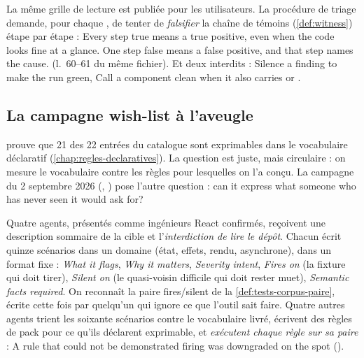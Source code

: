 La même grille de lecture est publiée pour les utilisateurs. La procédure de triage  demande, pour chaque \Warning{}, de tenter de \emph{falsifier} la chaîne de témoins (\cref{def:witness}) étape par étape : \og Every step true means a true positive, even when the code looks fine at a glance. One step false means a false positive, and that step names the cause.\fg{} (l.~60--61 du même fichier). Et deux interdits : \og Silence a finding to make the run green\fg{}, \og Call a component clean when it also carries  or \fg{}.

\subsection{La campagne \og wish-list à l'aveugle\fg{}}

 prouve que 21 des 22 entrées du catalogue sont exprimables dans le vocabulaire déclaratif (\cref{chap:regles-declaratives}). La question est juste, mais circulaire : on mesure le vocabulaire contre les règles pour lesquelles on l'a conçu. La campagne du 2 septembre 2026 (, ) pose l'autre question : \og can it express what someone who has never seen it would ask for?\fg{}

Quatre agents, présentés comme ingénieurs React confirmés, reçoivent une description sommaire de la cible et l'\emph{interdiction de lire le dépôt}. Chacun écrit quinze scénarios dans un domaine (état, effets, rendu, asynchrone), dans un format fixe : \emph{What it flags}, \emph{Why it matters}, \emph{Severity intent}, \emph{Fires on} (la fixture qui doit tirer), \emph{Silent on} (le quasi-voisin difficile qui doit rester muet), \emph{Semantic facts required}. On reconnaît la paire fires/silent de la \cref{def:tests-corpus-paire}, écrite cette fois par quelqu'un qui ignore ce que l'outil sait faire. Quatre autres agents trient les soixante scénarios contre le vocabulaire livré, écrivent des règles de pack pour ce qu'ils déclarent exprimable, et \emph{exécutent chaque règle sur sa paire} : \og A rule that could not be demonstrated firing was downgraded on the spot\fg{} ().


